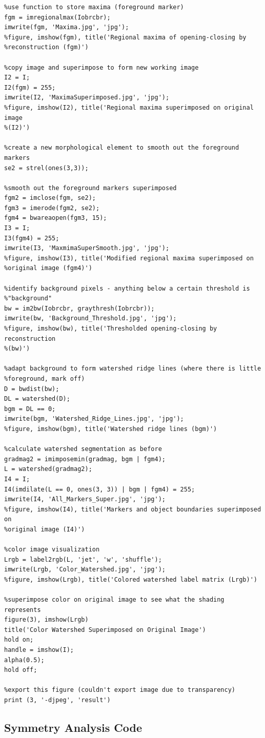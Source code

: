 \documentclass[12pt]{article}
\theoremstyle{plain}%
\theoremstyle{definition}
\theoremstyle{remark}
\begin{document}
\begin{verbatim}
%use function to store maxima (foreground marker)
fgm = imregionalmax(Iobrcbr);
imwrite(fgm, 'Maxima.jpg', 'jpg');
%figure, imshow(fgm), title('Regional maxima of opening-closing by
%reconstruction (fgm)')

%copy image and superimpose to form new working image
I2 = I;
I2(fgm) = 255;
imwrite(I2, 'MaximaSuperimposed.jpg', 'jpg');
%figure, imshow(I2), title('Regional maxima superimposed on original image
%(I2)')

%create a new morphological element to smooth out the foreground markers
se2 = strel(ones(3,3));

%smooth out the foreground markers superimposed
fgm2 = imclose(fgm, se2);
fgm3 = imerode(fgm2, se2);
fgm4 = bwareaopen(fgm3, 15);
I3 = I;
I3(fgm4) = 255;
imwrite(I3, 'MaxmimaSuperSmooth.jpg', 'jpg');
%figure, imshow(I3), title('Modified regional maxima superimposed on
%original image (fgm4)')

%identify background pixels - anything below a certain threshold is
%"background"
bw = im2bw(Iobrcbr, graythresh(Iobrcbr));
imwrite(bw, 'Background_Threshold.jpg', 'jpg');
%figure, imshow(bw), title('Thresholded opening-closing by reconstruction
%(bw)')

%adapt background to form watershed ridge lines (where there is little
%foreground, mark off)
D = bwdist(bw);
DL = watershed(D);
bgm = DL == 0;
imwrite(bgm, 'Watershed_Ridge_Lines.jpg', 'jpg');
%figure, imshow(bgm), title('Watershed ridge lines (bgm)')

%calculate watershed segmentation as before
gradmag2 = imimposemin(gradmag, bgm | fgm4);
L = watershed(gradmag2);
I4 = I;
I4(imdilate(L == 0, ones(3, 3)) | bgm | fgm4) = 255;
imwrite(I4, 'All_Markers_Super.jpg', 'jpg');
%figure, imshow(I4), title('Markers and object boundaries superimposed on
%original image (I4)')

%color image visualization
Lrgb = label2rgb(L, 'jet', 'w', 'shuffle');
imwrite(Lrgb, 'Color_Watershed.jpg', 'jpg');
%figure, imshow(Lrgb), title('Colored watershed label matrix (Lrgb)')

%superimpose color on original image to see what the shading represents
figure(3), imshow(Lrgb)
title('Color Watershed Superimposed on Original Image')
hold on;
handle = imshow(I);
alpha(0.5);
hold off;

%export this figure (couldn't export image due to transparency)
print (3, '-djpeg', 'result')
\end{verbatim}

\subsection{Symmetry Analysis Code}
\end{document}
